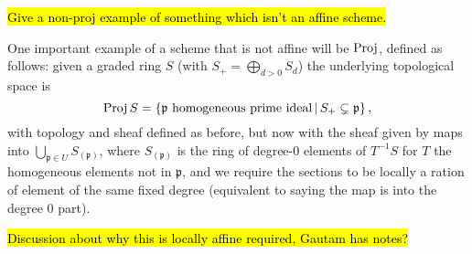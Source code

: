 \documentclass[000-main.tex]{subfiles}
\begin{document}
\begin{example}
  \hl{Give a non-proj example of something which isn't an affine scheme.}
\end{example}

One important example of a scheme that is not affine will be $\operatorname{Proj}$, defined as follows: given a graded ring $S$ (with $S_+ = \bigoplus_{d > 0 } S_d$) the underlying topological space is 
\[
  \operatorname{Proj} S = \left \lbrace \mathfrak{p} \text{ homogeneous prime ideal} \, | \, S_+ \subsetneq \mathfrak{p} \right \rbrace ,
\] 
with topology and sheaf defined as before, but now with the sheaf given by maps into $\bigcup_{\mathfrak{p} \in U} S_{(\mathfrak{p})}$, where $S_{(\mathfrak{p})}$ is the ring of degree-0 elements of $T^{-1}S$ for $T$ the homogeneous elements not in $\mathfrak{p}$, and we require the sections to be locally a ration of element of the same fixed degree (equivalent to saying the map is into the degree 0 part). 

\hl{Discussion about why this is locally affine required, Gautam has notes?} 
\end{document}

